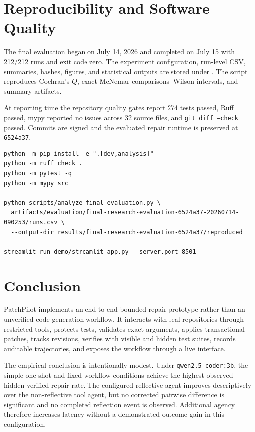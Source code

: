 \documentclass[11pt,a4paper]{article}
\newcommand{\code}[1]{\texttt{#1}}
\begin{document}
\section{Reproducibility and Software Quality}

The final evaluation began on July 14, 2026 and completed on July 15 with 212/212
runs and exit code zero. The experiment configuration, run-level CSV, summaries,
hashes, figures, and statistical outputs are stored under
. The script
 reproduces Cochran's $Q$, exact
McNemar comparisons, Wilson intervals, and summary artifacts.

At reporting time the repository quality gates report 274 tests passed, Ruff
passed, mypy reported no issues across 32 source files, and
\code{git diff --check} passed. Commits are signed and the evaluated repair
runtime is preserved at \code{6524a37}.

\begin{lstlisting}[basicstyle=\ttfamily\small,frame=single,
breaklines=true]
python -m pip install -e ".[dev,analysis]"
python -m ruff check .
python -m pytest -q
python -m mypy src

python scripts/analyze_final_evaluation.py \
  artifacts/evaluation/final-research-evaluation-6524a37-20260714-090253/runs.csv \
  --output-dir results/final-research-evaluation-6524a37/reproduced

streamlit run demo/streamlit_app.py --server.port 8501
\end{lstlisting}

\section{Conclusion}

PatchPilot implements an end-to-end bounded repair prototype rather than an
unverified code-generation workflow. It interacts with real repositories through
restricted tools, protects tests, validates exact arguments, applies
transactional patches, tracks revisions, verifies with visible and hidden test
suites, records auditable trajectories, and exposes the workflow through a live
interface.

The empirical conclusion is intentionally modest. Under
\code{qwen2.5-coder:3b}, the simple one-shot and fixed-workflow conditions
achieve the highest observed hidden-verified repair rate. The configured
reflective agent improves descriptively over the non-reflective tool agent, but
no corrected pairwise difference is significant and no completed reflection
event is observed. Additional agency therefore increases latency without a
demonstrated outcome gain in this configuration.
\end{document}
